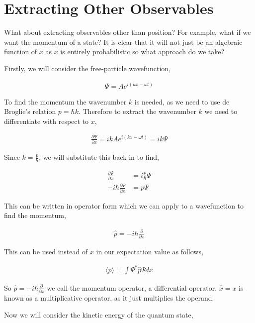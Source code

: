 \documentclass[11pt]{amsart}
\begin{document}
\section{Extracting Other Observables}

What about extracting observables other than position? For example, what if we want the momentum of a state? It is clear that it will not just be an algebraic function of $x$ as $x$ is entirely probabilistic so what approach do we take?

Firstly, we will consider the free-particle wavefunction,

\begin{align*}
  \Psi = A e^{i(kx - \omega t)}
\end{align*}

To find the momentum the wavenumber $k$ is needed, as we need to use de Broglie's relation $p = \hbar k$. Therefore to extract the wavenumber $k$ we need to differentiate with respect to $x$,

\begin{align*}
  \frac{\partial \Psi}{\partial x} = ik A e^{i(kx - \omega t)} = ik \Psi
\end{align*}

Since $k = \frac{p}{\hbar}$, we will substitute this back in to find,

\begin{align*}
  \frac{\partial \Psi}{\partial x} &= i \frac{p}{\hbar} \Psi \\
  -i\hbar \frac{\partial \Psi}{\partial x} &= p \Psi
\end{align*}

This can be written in operator form which we can apply to a wavefunction to find the momentum,

\begin{align*}
  \hat{p} = -i\hbar \frac{\partial}{\partial x}
\end{align*}

This can be used instead of $x$ in our expectation value as follows,

\begin{align*}
  \langle p\rangle = \int \Psi^* \hat{p} \Psi dx
\end{align*}

So $\hat{p} = -i\hbar \frac{\partial}{\partial x}$ we call the momentum operator, a differential operator. $\hat{x} = x$ is known as a multiplicative operator, as it just multiplies the operand.

Now we will consider the kinetic energy of the quantum state,
\end{document}
